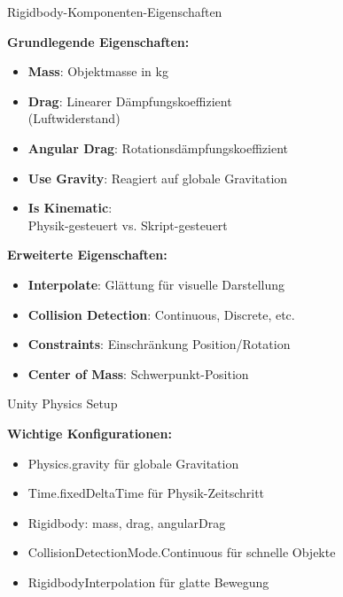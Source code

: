 \begin{definition}{Rigidbody-Komponenten-Eigenschaften}

    \textbf{Grundlegende Eigenschaften:}
    \begin{itemize}
        \item \textbf{Mass}: Objektmasse in kg
        \item \textbf{Drag}: Linearer Dämpfungskoeffizient\\ (Luftwiderstand)
        \item \textbf{Angular Drag}: Rotationsdämpfungskoeffizient
        \item \textbf{Use Gravity}: Reagiert auf globale Gravitation
        \item \textbf{Is Kinematic}: \\ Physik-gesteuert vs. Skript-gesteuert
    \end{itemize}
    
    \textbf{Erweiterte Eigenschaften:}
    \begin{itemize}
        \item \textbf{Interpolate}: Glättung für visuelle Darstellung
        \item \textbf{Collision Detection}: Continuous, Discrete, etc.
        \item \textbf{Constraints}: Einschränkung Position/Rotation
        \item \textbf{Center of Mass}: Schwerpunkt-Position
    \end{itemize}
\end{definition}

\begin{concept}{Unity Physics Setup}

    \textbf{Wichtige Konfigurationen:}
    \begin{itemize}
        \item Physics.gravity für globale Gravitation
        \item Time.fixedDeltaTime für Physik-Zeitschritt
        \item Rigidbody: mass, drag, angularDrag
        \item CollisionDetectionMode.Continuous für schnelle Objekte
        \item RigidbodyInterpolation für glatte Bewegung
    \end{itemize}
\end{concept}


